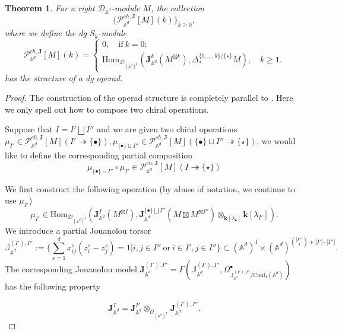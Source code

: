 \documentclass[11pt]{amsart}
\newtheorem{thm}{Theorem}[section]
\theoremstyle{definition}
\theoremstyle{remark}
\numberwithin{equation}{section}
\begin{document}
\begin{thm}\label{DgOperadStructure}
  For a right $\mathcal{D}_{\mathbb{A}^d}$-module $M$, the collection
  \[
    \{ \mathcal{P}^{ch,\mathbf{J}}_{\mathbb{A}^d}[M](k) \}_{k \geq 0},
  \]
  where we define the dg $S_k$-module
$$
\mathcal{P}^{ch,\mathbf{J}}_{\mathbb{A}^d}[M](k)=\begin{cases}
  0,\quad \text{if}\ k=0;\\
\mathrm{Hom}_{\mathcal{D}_{(\mathbb{A}^d)^{k}}}\left(\mathbf{J}_{\mathbb{A}^d}^{k}(M^{\boxtimes k}),\Delta^{\{1,\dots,k\}/\{\star\}}_*M\right),\quad k\geq 1.
\end{cases}
$$
has the structure of a dg operad.
\end{thm}
\begin{proof}
  The construction of the operad structure is completely parallel to \cite{FGY}. Here we only spell out how to compose two chiral operations.

    Suppose that ${I}={I'}\bigsqcup {I''}$ and we are given two chiral operations $\mu_{{I'}}\in   \mathcal{P}^{ch,\mathbf{J}}_{\mathbb{A}^d}[M](I'\twoheadrightarrow \{\bullet\}),\mu_{\{\bullet\}\sqcup I''}\in \mathcal{P}^{ch,\mathbf{J}}_{\mathbb{A}^d}[M](\{\bullet\}\sqcup I''\twoheadrightarrow \{\star\})$, we would like to define the corresponding partial composition
    $$
    \mu_{\{\bullet\}\sqcup I''}\circ \mu_{ I'}\in \mathcal{P}^{ch,\mathbf{J}}_{\mathbb{A}^d}[M](I\twoheadrightarrow \{\star\})
    $$


    We first construct the following operation (by abuse of notation, we continue to use $\mu_{{I'}}$)
    \[
\mu_{{I'}}\in \mathrm{Hom}_{\mathcal{D}_{(\mathbb{A}^d)^{{I}}}}\left(\mathbf{J}_{\mathbb{A}^d}^{{I}}(M^{\boxtimes{I}}),\mathbf{J}^{\{\bullet\}\bigsqcup{I''}}_{\mathbb{A}^d}(M\boxtimes M^{\boxtimes{I''}})\otimes_{\mathbf{k}[\lambda_{\bullet}]}\mathbf{k}[\lambda_{I'}]\right).
\]
We introduce a partial Jouanolou torsor
$$
\mathbb{J}_{\mathbb{A}^d}^{({I'}),{I''}}:=\{\sum_{s=1}^d x_{ij}^s(z^s_i-z^s_j)=1|i,j\in I''\ \text{or}\  i\in I', j\in I''\}\subset (\mathbb{A}^d)^{{I}}\times (\mathbb{A}^d)^{\binom{|I''|}{2}+|I'|\cdot |I''|}.
$$
The corresponding Jouanolou model $\mathbf{J}_{\mathbb{A}^d}^{({I'}),{I''}}=\Gamma(\mathbb{J}_{\mathbb{A}^d}^{({I'}),{I''}},\Omega^{\bullet}_{\mathbb{J}_{\mathbb{A}^d}^{({I'}),{I''}}/\mathrm{Conf}_{ I}(\mathbb{A}^d)})$ has the following property

$$
\mathbf{J}_{\mathbb{A}^d}^{{I}}=\mathbf{J}_{\mathbb{A}^d}^{{I'}}\otimes_{\mathcal{O}_{(\mathbb{A}^d)^{{I'}}}} \mathbf{J}_{\mathbb{A}^d}^{({I'}),{I''}}.
$$


\end{proof}
\end{document}

